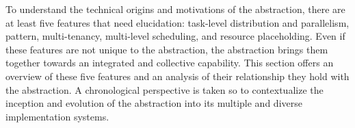 \documentclass{sig-alternate}
\begin{document}







To understand the technical origins and motivations of the \pilot abstraction,
there are at least five features that need elucidation: task-level distribution
and parallelism, \MW pattern, multi-tenancy, multi-level scheduling, and
resource placeholding. Even if these features are not unique to the \pilot
abstraction, the \pilot abstraction brings them together towards an integrated
and collective capability. This section offers an overview of these five
features and an analysis of their relationship they hold with the \pilot
abstraction. A chronological perspective is taken so to contextualize the
inception and evolution of the \pilot abstraction into its multiple and diverse
implementation systems.
\end{document}
